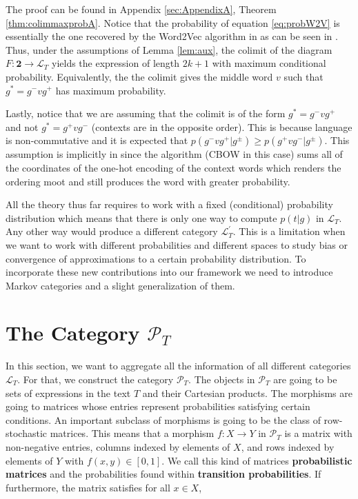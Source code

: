 \documentclass[10pt,a4paper]{elsarticle}
\renewcommand{\L}{\mathcal{L}}
\renewcommand{\P}{\mathcal{P}}
\begin{document}
The proof can be found in Appendix \ref{sec:AppendixA}, Theorem \ref{thm:colimmaxprobA}. Notice that the probability of equation \ref{eq:probW2V} is essentially the one recovered by the Word2Vec algorithm in \cite{Mikolov2013EfficientEO} as can be seen in \cite{levy2014neural}. Thus, under the assumptions of Lemma \ref{lem:aux}, the colimit of the diagram $F\colon \textbf{2}\to \L_{T}$  yields the expression of length $2k+1$ with maximum conditional probability. Equivalently, the the colimit gives the middle word $v$ such that $g^{*}=g^{-}vg^{+}$ has maximum probability. 

Lastly, notice that we are assuming that the colimit is of the form $g^{*}=g^{-}vg^{+}$ and not $g^{*}=g^{+}vg^{-}$ (contexts are in the opposite order). This is because language is non-commutative and it is expected that $p(g^{-}vg^{+}|g^{\pm})\geq p(g^{+}vg^{-}|g^{\pm})$. This assumption is implicitly in \cite{Mikolov2013EfficientEO} since the algorithm (CBOW in this case) sums all of the coordinates of the one-hot encoding of the context words which renders the ordering moot and still produces the word with greater probability.

All the theory thus far requires to work with a fixed (conditional) probability distribution which means that there is only one way to compute $p(t|g)$ in $\L_{T}$. Any other way would produce a different category $\L^{\prime}_{T}$. This is a limitation when we want to work with different probabilities and different spaces to study bias or convergence of approximations to a certain probability distribution. To incorporate these new contributions into our framework we need to introduce Markov categories and a slight generalization of them.


\section{The Category $\P_{T}$}\label{sec:P_T}

In this section, we want to aggregate all the information of all different categories $\L_{T}$. For that, we construct the category $\P_{T}$. The objects in $ \P_{T} $ are going to be sets of expressions in the text $T$ and their Cartesian products. The morphisms are going to matrices whose entries represent probabilities satisfying certain conditions. An important subclass of morphisms is going to be the class of row-stochastic matrices. This means that a morphism $f\colon X \to Y$ in $\P_{T}$ is a matrix with non-negative entries, columns indexed by elements of $X$, and rows indexed by elements of $Y$ with $f(x,y)\in [0,1]$. We call this kind of matrices \textbf{probabilistic matrices} and the probabilities found within \textbf{transition probabilities}. If furthermore, the matrix satisfies for all $x\in X$,
\end{document}
